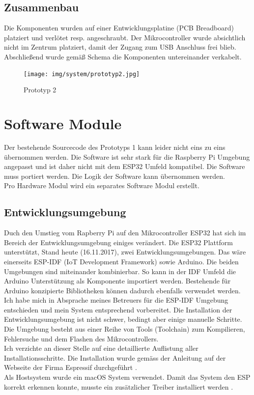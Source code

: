 \documentclass[11pt,english,german]{report}
\theoremstyle{definition}
\begin{document}
\newpage
\subsection{Zusammenbau}
Die Komponenten wurden auf einer Entwicklungsplatine (PCB Breadboard) platziert und verlötet resp. angeschraubt. Der Mikrocontroller wurde absichtlich nicht im Zentrum platziert, damit der Zugang zum USB Anschluss frei blieb. Abschließend wurde gemäß Schema die Komponenten untereinander verkabelt.\\
\begin{figure}[H]
	\centering
	\texttt{[image: img/system/prototyp2.jpg]}
	\caption[Prototyp 2]
	{Prototyp 2}
\end{figure}

\newpage

\section{Software Module}
Der bestehende Sourcecode des Prototyps 1 kann leider nicht eins zu eins übernommen werden. Die Software ist sehr stark für die Raspberry Pi Umgebung angepasst und ist daher nicht mit dem ESP32 Umfeld kompatibel. Die Software muss portiert werden. Die Logik der Software kann übernommen werden.\\[0.3cm]
Pro Hardware Modul wird ein separates Software Modul erstellt.

\subsection{Entwicklungsumgebung}
Duch den Umstieg vom Rapberry Pi auf den Mikrocontroller ESP32 hat sich im Bereich der Entwicklungsumgebung einiges verändert. Die ESP32 Plattform unterstützt, Stand heute (16.11.2017), zwei Entwicklungsumgebungen. Das wäre einerseits ESP-IDF (IoT Development Framework) sowie Arduino\cite{espidfarduino}. Die beiden Umgebungen sind miteinander kombinierbar. So kann in der IDF Umfeld die Arduino Unterstützung als Komponente importiert werden. Bestehende für Arduino konzipierte Bibliotheken können dadurch ebenfalls verwendet werden. Ich habe mich in Absprache meines Betreuers für die ESP-IDF Umgebung entschieden und mein System entsprechend vorbereitet. Die Installation der Entwicklungsumgebung ist nicht schwer, bedingt aber einige manuelle Schritte. Die Umgebung besteht aus einer Reihe von Tools (Toolchain) zum Kompilieren, Fehlersuche und dem Flashen des Mikrocontrollers.\\[0.3cm]
Ich verzichte an dieser Stelle auf eine detaillierte Auflistung aller Installationsschritte. Die Installation wurde gemäss der Anleitung auf der Webseite der Firma Espressif durchgeführt \cite{espidfinstallation}.\\[0.3cm]
Als Hostsystem wurde ein macOS System verwendet. Damit das System den ESP korrekt erkennen konnte, musste ein zusätzlicher Treiber installiert werden \cite{espidfdriver}. 
\end{document}
